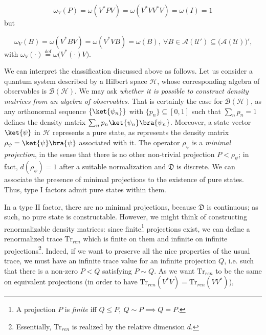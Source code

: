 \documentclass[a4paper,11pt]{article}
\newcommand{\eqdef}{\overset{\mathrm{def}}{=}}
\begin{document}
\begin{equation}
    \omega_V(P) = \omega(V^* P V) = \omega(V^* V V^* V) = \omega(I) = 1
\end{equation}
%
but

\begin{equation}
    \omega_V(B) = \omega(V^* B V) = \omega (V^* V B) = \omega(B), \ \forall B \in \mathcal{A}(\mathcal{U}') \subseteq \big( \mathcal{A}(\mathcal{U}) \big)' \text{,}
\end{equation}
%
with $\omega_V(\cdot) \eqdef \omega \big( V^* (\cdot) V \big)$.

We can interpret the classification discussed above as follows. Let us consider a quantum system described by a Hilbert space $\mathcal{H}$, whose corresponding algebra of observables is $\mathcal{B}(\mathcal{H})$. We may ask \textit{whether it is possible to construct density matrices from an algebra of observables}. That is certainly the case for $\mathcal{B}(\mathcal{H})$, as any orthonormal sequence $\{ \ket{\psi_n} \}$ with $ \{p_n\} \subseteq [0, 1]$ such that $\sum_n p_n = 1 $ defines the density matrix $\sum_n p_n \ket{\psi_n} \bra{\psi_n}$. Moreover, a state vector $\ket{\psi}$ in $\mathcal{H}$ represents a pure state, as represents the density matrix $\rho_{\psi} = \ket{\psi}\bra{\psi}$ associated with it. The operator $\rho_{\psi}$ is a \textit{minimal projection}, in the sense that there is no other non-trivial projection $P < \rho_{\psi}$; in fact, $d(\rho_{\psi}) = 1$ after a suitable normalization and $\mathfrak{D}$ is discrete. We can associate the presence of minimal projections to the existence of pure states. Thus, type $\mathrm{I}$ factors admit pure states within them.

In a type $\mathrm{II}$ factor, there are no minimal projections, because $\mathfrak{D}$ is continuous; as such, no pure state is constructable. However, we might think of constructing renormalizable density matrices: since finite\footnote{A projection $P$ is \textit{finite} iff $Q \leq P, \ Q \sim P \implies Q=P$.} projections exist, we can define a renormalized trace $\mathrm{Tr}_{ren}$ which is finite on them and infinite on infinite projections\footnote{Essentially, $\mathrm{Tr}_{ren}$ is realized by the relative dimension $d$.}. Indeed, if we want to preserve all the nice properties of the usual trace, we must have an infinite trace value for an infinite projection $Q$, i.e. such that there is a non-zero $P < Q$ satisfying $P \sim Q$. As we want $\mathrm{Tr}_{ren}$ to be the same on equivalent projections (in order to have $\mathrm{Tr}_{ren} (V^* V) = \mathrm{Tr}_{ren} (V V^*)$),
\end{document}
